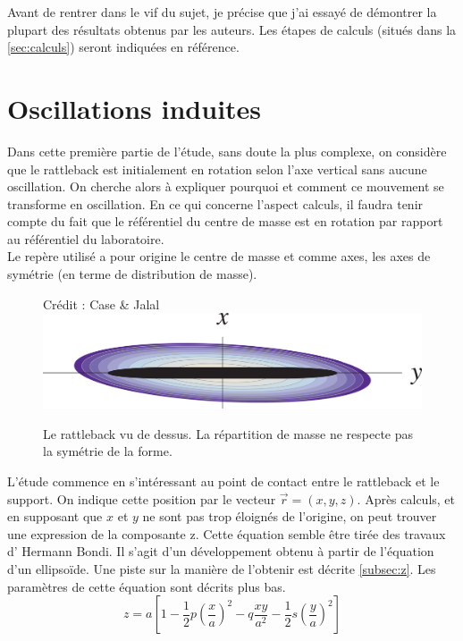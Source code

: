 \documentclass[12pt,a4paper]{article}
\begin{document}
	Avant de rentrer dans le vif du sujet, je précise que j'ai essayé de démontrer la plupart des résultats obtenus par les auteurs. Les étapes de calculs (situés dans la \autoref{sec:calculs}) seront indiquées en référence.
	\section{Oscillations induites}
	Dans cette première partie de l'étude, sans doute la plus complexe, on considère que le rattleback est initialement en rotation selon l'axe vertical sans aucune oscillation. On cherche alors à expliquer pourquoi et comment ce mouvement se transforme en oscillation.
	En ce qui concerne l'aspect calculs, il faudra tenir compte du fait que le référentiel du centre de masse est en rotation par rapport au référentiel du laboratoire.\\
	Le repère utilisé a pour origine le centre de masse et comme axes, les axes de symétrie (en terme de distribution de masse).\\
	\begin{figure}[h]
		\centering
		\caption{Le rattleback vu de dessus. La répartition de masse ne respecte pas la symétrie de la forme.}{Crédit : Case \& Jalal}
		\label{fig:mass-repartition}
		\includegraphics[width=0.7\linewidth]{"mass repartition"}
	\end{figure}
	
	L'étude commence en s'intéressant au point de contact entre le rattleback et le support. On indique cette position par le vecteur $\vec{r}=(x,y,z)$. Après calculs, et en supposant que $x$ et $y$ ne sont pas trop éloignés de l'origine, on peut trouver une expression de la composante z.
	Cette équation semble être tirée des travaux d' Hermann Bondi. Il s'agit d'un développement obtenu à partir de l'équation d'un ellipsoïde. Une piste sur la manière de l'obtenir est décrite \autoref{subsec:z}. Les paramètres de cette équation sont décrits plus bas.
	\begin{equation}
	z=a\left[ 1-\dfrac {1} {2}p\left( \dfrac {x} {a}\right) ^{2}-q\dfrac {xy} {a^{2}}-\dfrac {1} {2}s\left( \dfrac {y} {a}\right) ^{2}\right]
	\label{eq:z}
	\end{equation}
	
\end{document}
